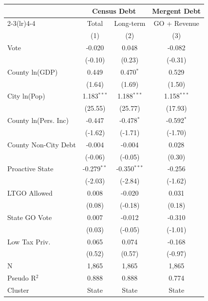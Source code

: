 \begingroup
\centering
\begin{tabular*}{\textwidth}{@{\extracolsep{\fill}}lccc}
   \toprule
                        & \multicolumn{2}{c}{Census Debt} & \multicolumn{1}{c}{Mergent Debt}\\  
   \cmidrule(lr){2-3}\cmidrule(lr){4-4}
                        & Total             & Long-term             & GO + Revenue \\   
                        & (1)               & (2)                   & (3)\\  
   \midrule 
   Vote                 & -0.020            & 0.048                 & -0.082\\   
                        & (-0.10)          & (0.23)               & (-0.31)\\   
   County ln(GDP)       & 0.449             & 0.470$^{*}$           & 0.529\\   
                        & (1.64)           & (1.69)               & (1.50)\\   
   City ln(Pop)         & 1.183$^{***}$     & 1.188$^{***}$         & 1.158$^{***}$\\   
                        & (25.55)          & (25.77)              & (17.93)\\   
   County ln(Pers. Inc) & -0.447            & -0.478$^{*}$          & -0.592$^{*}$\\   
                        & (-1.62)          & (-1.71)              & (-1.70)\\   
   County Non-City Debt & -0.004            & -0.004                & 0.028\\   
                        & (-0.06)          & (-0.05)              & (0.30)\\   
   Proactive State      & -0.279$^{**}$     & -0.350$^{***}$        & -0.256\\   
                        & (-2.03)          & (-2.84)              & (-1.62)\\   
   LTGO Allowed         & 0.008             & -0.020                & 0.031\\   
                        & (0.08)           & (-0.18)              & (0.18)\\   
   State GO Vote        & 0.007             & -0.012                & -0.310\\   
                        & (0.03)           & (-0.05)              & (-1.01)\\   
   Low Tax Priv.        & 0.065             & 0.074                 & -0.168\\   
                        & (0.52)           & (0.57)               & (-0.97)\\   
   \hline
   N         & 1,865             & 1,865                 & 1,865\\  
   Pseudo R$^2$         & 0.888             & 0.888                 & 0.774\\  
   Cluster              & State & State & State\\  
   \bottomrule
\end{tabular*}
\par\endgroup
